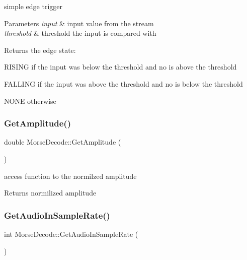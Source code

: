 simple edge trigger 


\begin{DoxyParams}{Parameters}
{\em input} & input value from the stream \\
\hline
{\em threshold} & threshold the input is compared with \\
\hline
\end{DoxyParams}
\begin{DoxyReturn}{Returns}
the edge state\+:
\begin{DoxyItemize}
\item R\+I\+S\+I\+NG if the input was below the threshold and no is above the threshold
\item F\+A\+L\+L\+I\+NG if the input was above the threshold and no is below the threshold
\item N\+O\+NE otherwise 
\end{DoxyItemize}
\end{DoxyReturn}
\mbox{\label{classMorseDecode_a610be58591f00c28eb624f062115ce82}} 
\subsubsection{\texorpdfstring{Get\+Amplitude()}{GetAmplitude()}}
{\footnotesize\ttfamily double Morse\+Decode\+::\+Get\+Amplitude (\begin{DoxyParamCaption}{ }\end{DoxyParamCaption})}



access function to the normilzed amplitude 

\begin{DoxyReturn}{Returns}
normilized amplitude 
\end{DoxyReturn}
\mbox{\label{classMorseDecode_a2827ff2cfbdf56c76154c1d471a0aca5}} 
\subsubsection{\texorpdfstring{Get\+Audio\+In\+Sample\+Rate()}{GetAudioInSampleRate()}}
{\footnotesize\ttfamily int Morse\+Decode\+::\+Get\+Audio\+In\+Sample\+Rate (\begin{DoxyParamCaption}{ }\end{DoxyParamCaption})}



